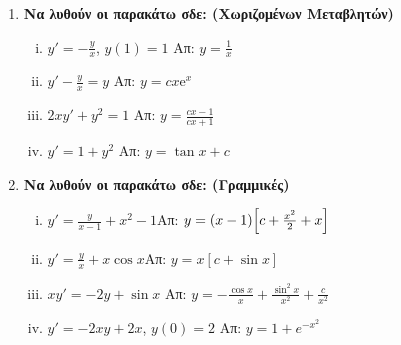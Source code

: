 


\pagestyle{askhseis}





\begin{center}
\end{center}

\vspace{\baselineskip}

\begin{enumerate}
  \item {\bfseries Να λυθούν οι παρακάτω σδε: (Χωριζομένων Μεταβλητών)}
    \begin{enumerate}[i)]
      \item $ y' = - \frac{y}{x} $, \quad $ y(1)=1 $ \hfill Απ: $ y = \frac{1}{x} $ 
      \item $ y'- \frac{y}{x} = y $ \hfill Απ: $ y=cx \mathrm{e}^{x} $ 
      \item $ 2xy'+y^{2} = 1 $ \hfill Απ: $ y= \frac{cx-1}{cx+1} $ 
      \item $ y'=1+y^{2} $ \hfill Απ: $ y= \tan{x+c} $ 
    \end{enumerate}

  \item {\bfseries Να λυθούν οι παρακάτω σδε: (Γραμμικές)}
    \begin{enumerate}[i)]
      \item $y'=\frac{y}{x-1}+x^2-1$\hfill Απ: $y=(x-1)\Bigl[c+\frac{x^2}{2}+x\Bigr]$
      \item $y'=\frac{y}{x}+x\cos x$\hfill Απ: $y=x[c+\sin x]$
      \item $xy'=-2y+ \sin{x}$ \hfill Απ: $ y= - \frac{\cos{x}}{x} +
        \frac{\sin^{2}{x}}{x^{2}} + \frac{c}{x^{2}} $ 
      \item $ y'=-2xy+2x $, \quad $ y(0)=2 $ \hfill Απ: $ y=1+e^{-x^{2}} $  
    \end{enumerate}


\end{enumerate}
